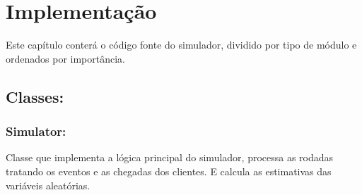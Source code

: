 \chapter{Implementação}

Este capítulo conterá o código fonte do simulador, dividido por tipo de módulo e ordenados por importância.\\

\section{Classes:}

\subsection{Simulator:}
Classe que implementa a lógica principal do simulador, processa as rodadas tratando os eventos e as chegadas dos clientes. E calcula as estimativas das variáveis aleatórias.\\

